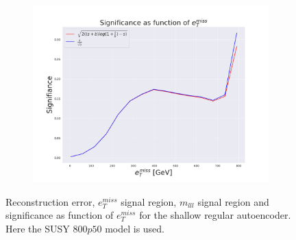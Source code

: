 \begin{figure}[H]
    \hfill  
    \begin{subfigure}{.40\textwidth}
        \includegraphics[width=\textwidth]{Figures/VAE_testing/small/2lep/significance_etmiss_800p0p050_-0.6406612200568815.pdf}
        \caption{}
        \label{fig:VAE_2lep_small_signi_800_2}
    \end{subfigure}
    \hfill      
    \caption[2lep shallow network | $800p50$ | VAE | 2]{Reconstruction error, $e_T^{miss}$ signal region, $m_{lll}$ signal region and significance as function of 
    $e_T^{miss}$ for the shallow regular autoencoder. Here the SUSY $800p50$ model is used.}
    \label{fig:VAE_2lep_small_rec_sig_signi_800_2}
\end{figure}




























